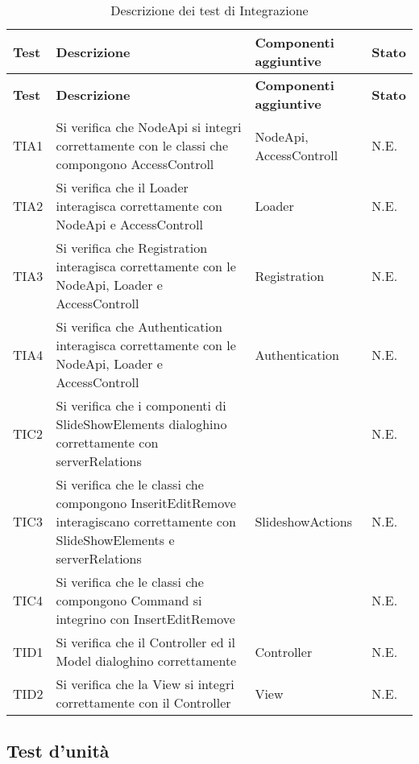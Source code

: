 {{	\begin{longtable} [c]{| p{2cm} | p{6cm} |p{3cm} | p{5cm} |}
			\caption{Descrizione dei test di Integrazione \label{tab:verReqInteg}}\\
		 \hline
		 \textbf{Test} & \textbf{Descrizione} & \textbf{Componenti aggiuntive}& \textbf{Stato} \\
		 \hline
		 \endfirsthead
		 \hline
		 \textbf{Test} & \textbf{Descrizione} & \textbf{Componenti aggiuntive}& \textbf{Stato} \\
		 \hline
			\endhead
		 \hline
		 \endfoot
		 \hline
		 \endlastfoot
			TIA1 & Si verifica che NodeApi si integri correttamente con le classi che compongono AccessControll & NodeApi, AccessControll & N.E.\\
			\hline
			TIA2 & Si verifica che il Loader interagisca correttamente con NodeApi e AccessControll  & Loader & N.E.\\
			\hline
			TIA3 & Si verifica che Registration interagisca correttamente con le NodeApi, Loader e AccessControll & Registration & N.E.\\
			\hline
			TIA4 & Si verifica che Authentication interagisca correttamente con le NodeApi, Loader e AccessControll & Authentication & N.E.\\
			\hline
			TIC2 & Si verifica che i componenti di SlideShowElements dialoghino correttamente con serverRelations &  & N.E.\\
			\hline
			TIC3 & Si verifica che le classi che compongono InseritEditRemove interagiscano correttamente con SlideShowElements e serverRelations & SlideshowActions & N.E.\\
			\hline
			TIC4 & Si verifica che le classi che compongono Command si integrino con InsertEditRemove &  & N.E.\\
			\hline
			TID1 & Si verifica che il Controller  ed il Model dialoghino correttamente & Controller & N.E.\\
			\hline
			TID2 & Si verifica che la View si integri correttamente con il Controller & View & N.E.\\
		\end{longtable}
}
}
\newpage
\subsection{Test d'unità}
		
